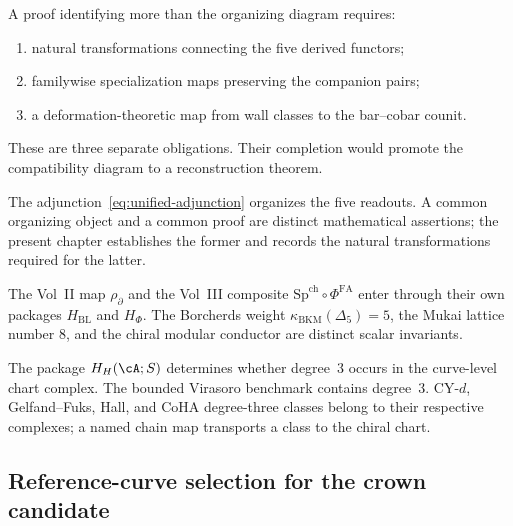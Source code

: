 \begin{proposition}
\label{prop:unified-identity-three-path-verification}
\ClaimStatusOpen
A proof identifying more than the organizing diagram requires:
\begin{enumerate}[label=\textup{(V\arabic*)}]
\item natural transformations connecting the five derived functors;
\item familywise specialization maps preserving the companion pairs;
\item a deformation-theoretic map from wall classes to the bar--cobar
counit.
\end{enumerate}
These are three separate obligations.  Their completion would promote
the compatibility diagram to a reconstruction theorem.
\end{proposition}

\begin{remark}
\label{rem:unified-identity-one-theorem-five-shadows}
The adjunction~\eqref{eq:unified-adjunction} organizes the five
readouts.  A common organizing object and a common proof are distinct
mathematical assertions; the present chapter establishes the former
and records the natural transformations required for the latter.
\end{remark}

\begin{remark}
\label{rem:unified-identity-cross-volume-reading}
The Vol~II map \(\rho_\partial\) and the Vol~III composite
\(\mathrm{Sp}^{\mathrm{ch}}\circ\Phi^{\mathrm{FA}}\) enter through
their own packages \(H_{\mathrm{BL}}\) and \(H_\Phi\).  The Borcherds
weight \(\kappa_{\mathrm{BKM}}(\Delta_5)=5\), the Mukai lattice number
\(8\), and the chiral modular conductor are distinct scalar
invariants.
\end{remark}

\begin{remark}
\label{rem:climax-unified-chirhoch3-portrait}
The package $H_H(\cA;S)$ determines whether degree~$3$ occurs in the
curve-level chart complex.  The bounded Virasoro benchmark contains
degree~$3$.  CY-$d$, Gelfand--Fuks, Hall, and CoHA degree-three classes
belong to their respective complexes; a named chain map transports a
class to the chiral chart.
\end{remark}

\subsection{Reference-curve selection for the crown candidate}
\label{ssec:climax-crown-named-curve}

